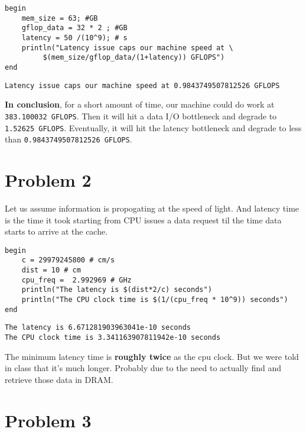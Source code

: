 \documentclass[11pt]{article}
\begin{document}
\begin{verbatim}
begin
    mem_size = 63; #GB
    gflop_data = 32 * 2 ; #GB
    latency = 50 /(10^9); # s
    println("Latency issue caps our machine speed at \
         $(mem_size/gflop_data/(1+latency)) GFLOPS")
end
\end{verbatim}

\begin{verbatim}
Latency issue caps our machine speed at 0.9843749507812526 GFLOPS
\end{verbatim}



\textbf{In conclusion}, for a short amount of time, our machine could do work at
\texttt{383.100032 GFLOPS}. Then it will hit a data I/O bottleneck and degrade to
\texttt{1.52625 GFLOPS}. Eventually, it will hit the latency bottleneck and degrade to
less than \texttt{0.9843749507812526 GFLOPS}.

\section{Problem 2}
\label{sec:orgc72fee5}
Let us assume information is propogating at the speed of light. And latency time
is the time it took starting from CPU issues a data request til the time data
starts to arrive at the cache.

\begin{verbatim}
begin
    c = 29979245800 # cm/s
    dist = 10 # cm
    cpu_freq =  2.992969 # GHz
    println("The latency is $(dist*2/c) seconds")
    println("The CPU clock time is $(1/(cpu_freq * 10^9)) seconds")
end
\end{verbatim}

\begin{verbatim}
The latency is 6.671281903963041e-10 seconds
The CPU clock time is 3.341163907811942e-10 seconds
\end{verbatim}


The minimum latency time is \textbf{roughly twice} as the cpu clock. But we were told
in class that it's much longer. Probably due to the need to actually find and
retrieve those data in DRAM.

\section{Problem 3}
\label{sec:org2669384}
\end{document}
